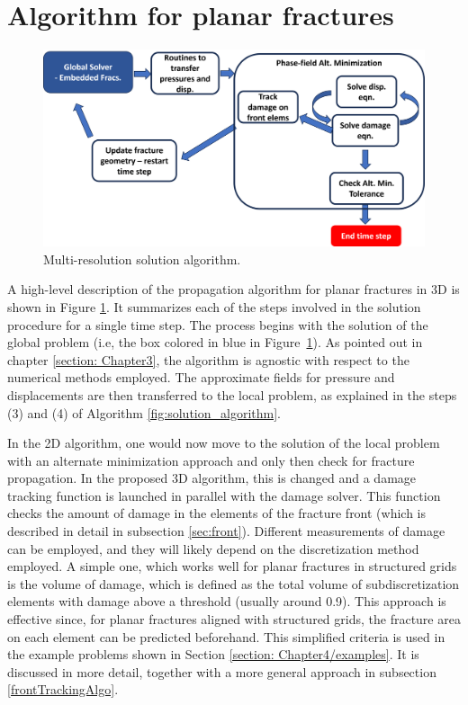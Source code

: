 \section{Algorithm for planar fractures}
\label{section: Chapter4/algo}

\begin{figure}[h]
    \centering
    \includegraphics[width=\linewidth]{Chapter4/figures/planar3D_algorithm.png}
    \caption{Multi-resolution solution algorithm.}
    \label{fig:MR_planar_algo}
\end{figure}

A high-level description of the propagation algorithm for planar fractures in 3D is shown in Figure \ref{fig:MR_planar_algo}. It summarizes each of the steps involved in the solution procedure for a single time step. The process begins with the solution of the global problem (i.e, the box colored in blue in Figure~\ref{fig:MR_planar_algo}). As pointed out in chapter \ref{section: Chapter3}, the algorithm is agnostic with respect to the numerical methods employed. The approximate fields for pressure and displacements are then transferred to the local problem, as explained in the steps (3) and (4) of Algorithm \ref{fig:solution_algorithm}.

In the 2D algorithm, one would now move to the solution of the local problem with an alternate minimization approach and only then check for fracture propagation. In the proposed 3D algorithm, this is changed and a damage tracking function is launched in parallel with the damage solver. This function checks the amount of damage in the elements of the fracture front (which is described in detail in subsection \ref{sec:front}). Different measurements of damage can be employed, and they will likely depend on the discretization method employed. A simple one, which works well for planar fractures in structured grids is the volume of damage, which is defined as the total volume of subdiscretization elements with damage above a threshold (usually around 0.9). This approach is effective since, for planar fractures aligned with structured grids, the fracture area on each element can be predicted beforehand. This simplified criteria is used in the example problems shown in Section \ref{section: Chapter4/examples}. It is discussed in more detail, together with a more general approach in subsection \ref{frontTrackingAlgo}.

